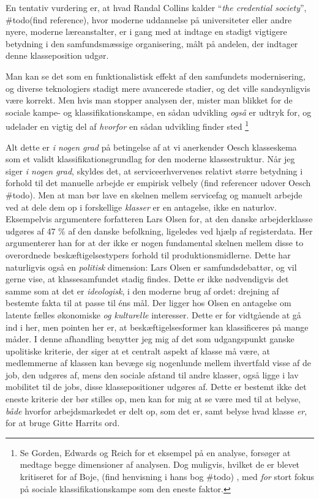 En tentativ vurdering er, at hvad Randal Collins kalder “\emph{the credential society}”, \#todo(find reference), hvor moderne uddannelse på universiteter eller andre nyere, moderne læreanstalter, er i gang med at indtage en stadigt vigtigere betydning i den samfundsmæssige organisering, målt på andelen, der indtager denne klasseposition udgør. 

Man kan se det som en funktionalistisk effekt af den samfundets modernisering, og diverse teknologiers stadigt mere avancerede stadier,  og det ville sandsynligvis være korrekt. Men hvis man stopper analysen der, mister man blikket for de sociale kampe- og klassifikationskampe, en sådan udvikling \emph{også} er udtryk for, og udelader en vigtig del af \emph{hvorfor} en sådan udvikling finder sted%
%
		\footnote{ Se Gorden, Edwards og Reich \citeyear{Gordon1982} for et eksempel på en analyse, forsøger at medtage begge dimensioner af analysen. Dog muligvis, hvilket de er blevet kritiseret for af Boje, (find henvisning i hans bog \#todo) , med \emph{for} stort fokus på sociale klassifikationskampe som den eneste faktor.}%
%

Alt dette er \emph{i nogen grad} på betingelse af at vi anerkender Oesch klasseskema som et validt klassifikationsgrundlag for den moderne klassestruktur. Når jeg siger \emph{i nogen grad}, skyldes det, at serviceerhvervenes relativt større betydning i forhold til det manuelle arbejde er empirisk velbely (find referencer udover Oesch \#todo). Men at man bør lave en skelnen mellem servicefag og manuelt arbejde ved at dele dem op i forskellige \emph{klasser} er en antagelse, ikke en naturlov. Eksempelvis argumentere forfatteren Lars Olsen for, at den danske arbejderklasse udgøres af 47 \% af den danske befolkning, ligeledes ved hjælp af registerdata. Her argumenterer han for at der ikke er nogen fundamental skelnen mellem disse to overordnede beskæftigelsestypers forhold til produktionsmidlerne. Dette har naturligvis også en \emph{politisk} dimension: Lars Olsen er samfundsdebattør, og vil gerne vise, at klassesamfundet stadig findes. Dette er ikke nødvendigvis det samme som at det er \emph{ideologisk}, i den moderne brug af ordet: drejning af bestemte fakta til at passe til éns mål.  Der ligger hos Olsen en antagelse om latente fælles økonomiske \emph{og kulturelle} interesser. Dette er for vidtgående at gå ind i her, men pointen her er, at beskæftigelsesformer kan klassificeres på mange måder. I denne afhandling benytter jeg mig af det som udgangspunkt ganske upolitiske kriterie, der siger at et centralt aspekt af klasse må være, at medlemmerne af klassen kan bevæge sig nogenlunde mellem ihvertfald visse af de job, den udgøres af, mens den sociale afstand til andre klasser, også ligge i lav mobilitet til de jobs, disse klassepositioner udgøres af. Dette er bestemt ikke det eneste kriterie der bør stilles op, men kan for mig at se være med til at belyse, \emph{både} hvorfor arbejdsmarkedet er delt op, som det er, samt belyse hvad klasse \emph{er}, for at bruge Gitte Harrits ord. 




